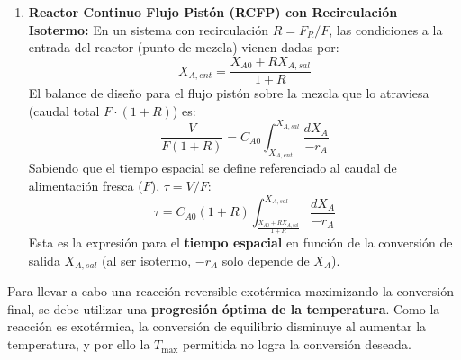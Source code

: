 \begin{enumerate}[label=\alph*)]
	\item \textbf{Reactor Continuo Flujo Pistón (RCFP) con Recirculación Isotermo:}
	      En un sistema con recirculación $R = F_R / F$, las condiciones a la entrada del reactor (punto de mezcla) vienen dadas por:
	      \begin{equation*}
		      X_{A,ent} = \frac{X_{A0} + R X_{A,sal}}{1 + R}
	      \end{equation*}
	      El balance de diseño para el flujo pistón sobre la mezcla que lo atraviesa (caudal total $F \cdot (1+R)$) es:
	      \begin{equation*}
		      \frac{V}{F(1+R)} = C_{A0} \int_{X_{A,ent}}^{X_{A,sal}} \frac{dX_A}{-r_A}
	      \end{equation*}
	      Sabiendo que el tiempo espacial se define referenciado al caudal de alimentación fresca ($F$), $\tau = V/F$:
	      \begin{equation*}
		      \tau = C_{A0} (1+R) \int_{\frac{X_{A0} + R X_{A,sal}}{1 + R}}^{X_{A,sal}} \frac{dX_A}{-r_A}
	      \end{equation*}
	      Esta es la expresión para el \textbf{tiempo espacial} en función de la conversión de salida $X_{A,sal}$ (al ser isotermo, $-r_A$ solo depende de $X_A$).
\end{enumerate}

\solve{}
Para llevar a cabo una reacción reversible exotérmica maximizando la conversión final, se debe utilizar una \textbf{progresión óptima de la temperatura}. Como la reacción es exotérmica, la conversión de equilibrio disminuye al aumentar la temperatura, y por ello la $T_{\text{max}}$ permitida no logra la conversión deseada.

